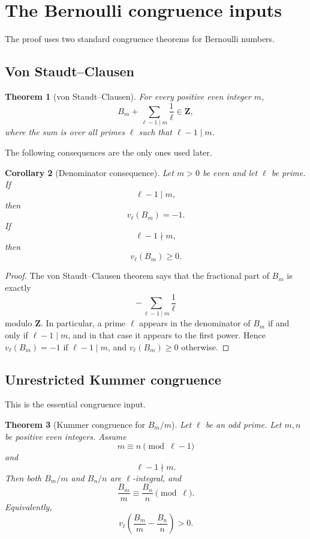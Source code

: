 \documentclass[11pt]{article}
\newtheorem{theorem}{Theorem}[section]
\newtheorem{corollary}[theorem]{Corollary}
\newcommand{\Z}{\mathbf Z}
\begin{document}
\section{The Bernoulli congruence inputs}\label{sec:inputs}

The proof uses two standard congruence theorems for Bernoulli numbers.

\subsection{Von Staudt--Clausen}

\begin{theorem}[von Staudt--Clausen]
For every positive even integer $m$,
\[
  B_m+\sum_{\ell-1\mid m}\frac{1}{\ell}\in\Z,
\]
where the sum is over all primes $\ell$ such that $\ell-1\mid m$.
\end{theorem}

The following consequences are the only ones used later.

\begin{corollary}[Denominator consequence]
Let $m>0$ be even and let $\ell$ be prime.  If
\[
  \ell-1\mid m,
\]
then
\[
  v_\ell(B_m)=-1.
\]
If
\[
  \ell-1\nmid m,
\]
then
\[
  v_\ell(B_m)\ge0.
\]
\end{corollary}

\begin{proof}
The von Staudt--Clausen theorem says that the fractional part of $B_m$ is exactly
\[
  -\sum_{\ell-1\mid m}\frac{1}{\ell}
\]
modulo $\Z$.  In particular, a prime $\ell$ appears in the denominator of $B_m$ if and only if $\ell-1\mid m$, and in that case it appears to the first power.  Hence $v_\ell(B_m)=-1$ if $\ell-1\mid m$, and $v_\ell(B_m)\ge0$ otherwise.
\end{proof}

\subsection{Unrestricted Kummer congruence}

This is the essential congruence input.

\begin{theorem}[Kummer congruence for $B_m/m$]\label{thm:kummer}
Let $\ell$ be an odd prime.  Let $m,n$ be positive even integers.  Assume
\[
  m\equiv n\pmod{\ell-1}
\]
and
\[
  \ell-1\nmid m.
\]
Then both $B_m/m$ and $B_n/n$ are $\ell$-integral, and
\[
  \frac{B_m}{m}\equiv \frac{B_n}{n}\pmod \ell.
\]
Equivalently,
\[
  v_\ell\left(\frac{B_m}{m}-\frac{B_n}{n}\right)>0.
\]
\end{theorem}
\end{document}

